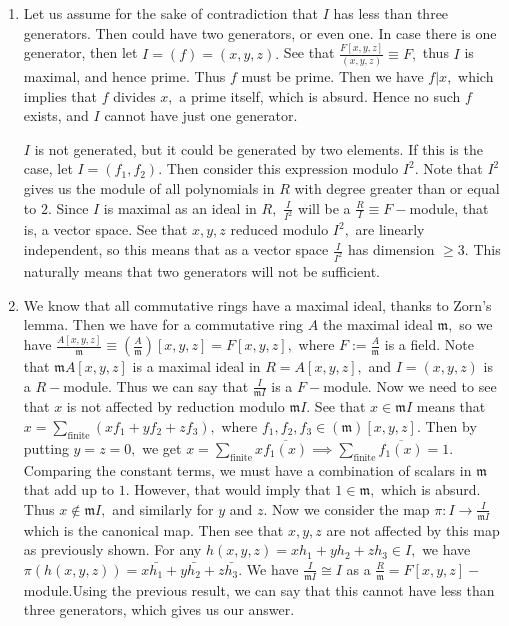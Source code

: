 \documentclass{article}
\begin{document}
\section{} %
\begin{enumerate}
	\item Let us assume for the sake of contradiction that $I$ has less than three generators. Then could have two generators, or even one. In case there is 
	one generator, then let $I=(f)=(x,y,z).$ See that $\frac{F[x,y,z]}{(x,y,z)}\equiv F,$ thus $I$ is maximal, and hence prime. Thus $f$ must be prime. Then 
	we have $f|x,$ which implies that $f$ divides $x,$ a prime itself, which is absurd. Hence no such $f$ exists, and $I$ cannot have just one generator.
	
	$I$ is not generated, but it could be generated by two elements. If this is the case, let $I=(f_1,f_2).$ Then consider this expression modulo $I^2.$ 
	Note that $I^2$ gives us the module of all polynomials in $R$ with degree greater than or equal to $2$. Since $I$ is maximal as an ideal in $R,$ 
	$\frac{I}{I^2}$ will be a $\frac{R}{I} \equiv F-$module, that is, a vector space. See that $x,y,z$ reduced modulo $I^2,$ are linearly independent, so 
	this means that as a vector space $\frac{I}{I^2}$ has dimension $\geq 3.$ This naturally means that two generators will not be sufficient. 
	
	\item We know that all commutative rings have a maximal ideal, thanks to Zorn's lemma. Then we have for a commutative ring $A$ the maximal ideal 
	$\mathfrak{m},$ so we have $\frac{A[x,y,z]}{\mathfrak{m}}\equiv \left(\frac{A}{\mathfrak{m}}\right)[x,y,z]=F[x,y,z],$ where $F:=\frac{A}{\mathfrak{m}}$ 
	is a field. Note that $\mathfrak{m}A[x,y,z]$ is a maximal ideal in $R=A[x,y,z],$ and $I=(x,y,z)$ is a $R-$module. Thus we can say that 
	$\frac{I}{\mathfrak{m}I}$ is a $F-$module. Now we need to see that $x$ is not affected by reduction modulo $\mathfrak{m}I.$ See that $x \in 
	\mathfrak{m}I$ means that $x=\sum_{\text{finite}} (xf_1+yf_2+zf_3),$ where $f_1,f_2,f_3 \in (\mathfrak{m})[x,y,z].$ Then by putting $y=z=0,$ we get 
	$x=\sum_{\text{finite}}x \overline{f_1(x)} \implies  \sum_{\text{finite}}\overline{f_1(x)}=1.$ Comparing the constant terms, we must have a combination 
	of 
	scalars in $\mathfrak{m}$ that add up to $1$. However, that would imply that $1 \in \mathfrak{m},$ which is absurd. Thus $x \notin \mathfrak{m}I,$ and 
	similarly for $y$ and $z.$ Now we consider the map $\pi: I \rightarrow \frac{I}{\mathfrak{m}I}$ which is the canonical map. Then see that $x,y,z$ are 
	not affected by this map as previously shown. For any $h(x,y,z)=xh_1+yh_2+zh_3 \in I,$ we have $\pi(h(x,y,z))=x\bar{h_1}+y\bar{h_2} + z\bar{h_3}.$ We 
	have $\frac{I}{\mathfrak{m}I} \cong I$ as a $\frac{R}{\mathfrak{m}}=F[x,y,z]-$module.Using the previous result, we can say that this cannot have less 
	than three generators, which gives us our answer. 
\end{enumerate}
\end{document}
